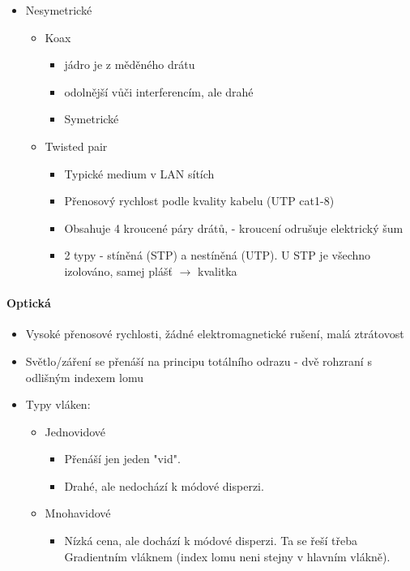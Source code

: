 \documentclass[10pt,a4paper]{article}
\begin{document}
\begin{itemize}
\item Nesymetrické
\begin{itemize}
\item Koax
\begin{itemize}
\item jádro je z měděného drátu
\item odolnější vůči interferencím, ale drahé
\item Symetrické
\end{itemize}
\end{itemize}

\begin{itemize}
\item Twisted pair
\begin{itemize}
\item Typické medium v LAN sítích
\item Přenosový rychlost podle kvality kabelu (UTP cat1-8)
\item Obsahuje 4 kroucené páry drátů, - kroucení odrušuje elektrický šum
\item 2 typy - stíněná (STP) a nestíněná (UTP). U STP je všechno izolováno, samej plášť $\rightarrow$ kvalitka
\end{itemize}
\end{itemize}
\end{itemize}
\paragraph{Optická}
\begin{itemize}
\item Vysoké přenosové rychlosti, žádné elektromagnetické rušení, malá ztrátovost
\item Světlo/záření se přenáší na principu totálního odrazu - dvě rohzraní s odlišným indexem lomu
\item Typy vláken:
\begin{itemize}
\item Jednovidové
\begin{itemize}
\item Přenáší jen jeden "vid".
\item Drahé, ale nedochází k módové disperzi.
\end{itemize}
\item Mnohavidové
\begin{itemize}
\item Nízká cena, ale dochází k módové disperzi. Ta se řeší třeba Gradientním vláknem (index lomu neni stejny v hlavním vlákně).
\end{itemize}
\end{itemize}
\end{itemize}
\end{document}
